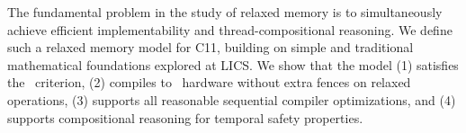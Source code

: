 The fundamental problem in the study of relaxed memory is to simultaneously achieve efficient implementability and thread-compositional reasoning.  We define such a relaxed memory model for C11, building on simple and traditional mathematical  foundations explored at LICS.   We show that the model (1) satisfies the \drfsc\ criterion, (2)
compiles to \mca\ hardware without extra fences on relaxed operations, (3)
supports all reasonable sequential compiler optimizations, and (4) supports compositional reasoning for temporal safety properties.
